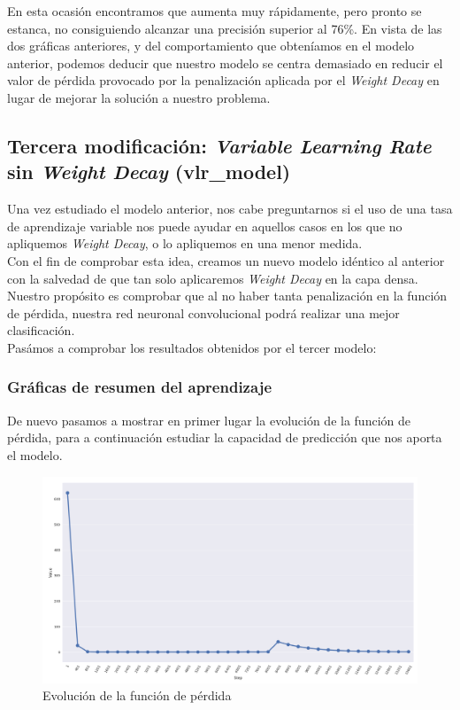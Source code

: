 \documentclass[11pt]{article}
\theoremstyle{plain}
\theoremstyle{definition}
\begin{document}
En esta ocasión encontramos que aumenta muy rápidamente, pero pronto
se estanca, no consiguiendo alcanzar una precisión superior al
76\%. En vista de las dos gráficas anteriores, y del comportamiento
que obteníamos en el modelo anterior, podemos deducir que nuestro
modelo se centra demasiado en reducir el valor de pérdida provocado
por la penalización aplicada por el \textit{Weight Decay} en lugar de
mejorar la solución a nuestro problema.

\subsection{Tercera modificación: \textit{Variable Learning Rate} sin \textit{Weight Decay} (vlr\_model)}

Una vez estudiado el modelo anterior, nos cabe preguntarnos si el uso de
una tasa de aprendizaje variable nos puede ayudar en aquellos casos en los
que no apliquemos \textit{Weight Decay}, o lo apliquemos en una menor medida.\\

Con el fin de comprobar esta idea, creamos un nuevo modelo idéntico al 
anterior con la salvedad de que tan solo aplicaremos \textit{Weight Decay} en 
la capa densa. Nuestro propósito es comprobar que al no haber tanta 
penalización en la función de pérdida, nuestra red neuronal convolucional 
podrá realizar una mejor clasificación.\\

Pasámos a comprobar los resultados obtenidos por el tercer modelo:

\subsubsection{Gráficas de resumen del aprendizaje}

De nuevo pasamos a mostrar en primer lugar la evolución de la función
de pérdida, para a continuación estudiar la capacidad de predicción 
que nos aporta el modelo.

\begin{figure}[H]
  \centering \includegraphics[width=.95\textwidth]{imgs/loss_vlr}
  \caption{Evolución de la función de pérdida}
\end{figure}
\end{document}
